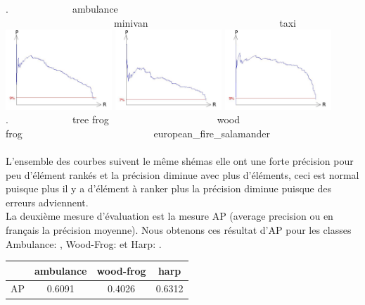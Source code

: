 \documentclass[a4paper,11pt]{report}
\begin{document}
.~~~~~~~~~~~~~ambulance ~~~~~~~~~~~~~~~~~~~~~~minivan~~~~~~~~~~~~~~~~~~~~~~~~~~ taxi\\
\includegraphics[width=0.3\textwidth]{RP_tree-frog.jpg}\hfill
\includegraphics[width=0.3\textwidth]{RP_wood-frog.jpg}\hfill
\includegraphics[width=0.3\textwidth]{RP_european_fire_salamander.jpg}\\
.~~~~~~~~~~~~~tree frog~~~~~~~~~~~~~~~~~~~~~~wood frog~~~~~~~~~~~~~~~~~~~~~~~~~~ european\_fire\_salamander\\\\

L'ensemble des courbes suivent le même shémas elle ont une forte précision pour peu d'élément rankés et la précision diminue avec plus d'éléments, ceci est normal puisque plus il y a d'élément à ranker plus la précision diminue puisque des erreurs adviennent.\\

La deuxième mesure d'évaluation est la mesure AP (average precision ou en français la précision moyenne). 
Nous obtenons ces résultat d'AP pour les classes Ambulance: , Wood-Frog: et Harp: .\\

\begin{center}
\begin{tabular}{|c|c|c|c|}
\hline
& ambulance & wood-frog & harp \\
\hline
\hline
AP & 0.6091 & 0.4026 & 0.6312 \\

\hline
\end{tabular}
\end{center}
\end{document}
